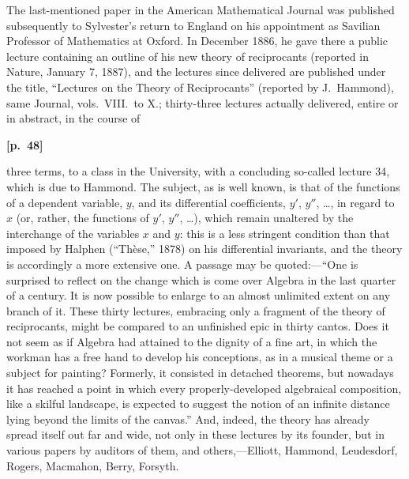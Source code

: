 \documentclass[11pt,a4paper]{article}
\theoremstyle{plain}
\begin{document}
The last-mentioned paper in the American Mathematical Journal was published subsequently to Sylvester's return to England on his appointment as Savilian Professor of Mathematics at Oxford. In December 1886, he gave there a public lecture containing an outline of his new theory of reciprocants (reported in Nature, January 7, 1887), and the lectures since delivered are published under the title, ``Lectures on the Theory of Reciprocants'' (reported by J.\ Hammond), same Journal, vols.\ VIII.\ to X.; thirty-three lectures actually delivered, entire or in abstract, in the course of

\vspace{0.5em}
\noindent\textbf{[p.\ 48]}

three terms, to a class in the University, with a concluding so-called lecture 34, which is due to Hammond. The subject, as is well known, is that of the functions of a dependent variable, $y$, and its differential coefficients, $y'$, $y''$, \ldots, in regard to $x$ (or, rather, the functions of $y'$, $y''$, \ldots), which remain unaltered by the interchange of the variables $x$ and $y$: this is a less stringent condition than that imposed by Halphen (``Th\`ese,'' 1878) on his differential invariants, and the theory is accordingly a more extensive one. A passage may be quoted:---``One is surprised to reflect on the change which is come over Algebra in the last quarter of a century. It is now possible to enlarge to an almost unlimited extent on any branch of it. These thirty lectures, embracing only a fragment of the theory of reciprocants, might be compared to an unfinished epic in thirty cantos. Does it not seem as if Algebra had attained to the dignity of a fine art, in which the workman has a free hand to develop his conceptions, as in a musical theme or a subject for painting? Formerly, it consisted in detached theorems, but nowadays it has reached a point in which every properly-developed algebraical composition, like a skilful landscape, is expected to suggest the notion of an infinite distance lying beyond the limits of the canvas.'' And, indeed, the theory has already spread itself out far and wide, not only in these lectures by its founder, but in various papers by auditors of them, and others,---Elliott, Hammond, Leudesdorf, Rogers, Macmahon, Berry, Forsyth.
\end{document}
